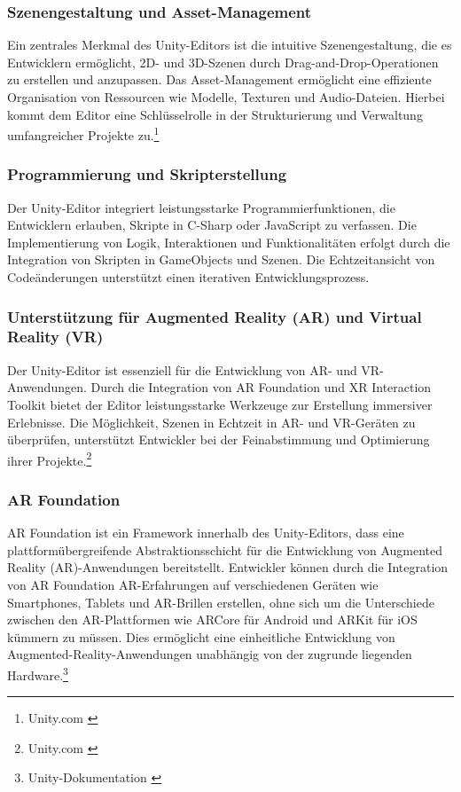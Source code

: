 \subsubsection{Szenengestaltung und Asset-Management}
Ein zentrales Merkmal des Unity-Editors ist die intuitive Szenengestaltung, die es Entwicklern ermöglicht,
2D- und 3D-Szenen durch Drag-and-Drop-Operationen zu erstellen und anzupassen. Das Asset-Management ermöglicht eine
effiziente Organisation von Ressourcen wie Modelle, Texturen und Audio-Dateien. Hierbei kommt dem Editor eine
Schlüsselrolle in der Strukturierung und Verwaltung umfangreicher Projekte zu.\footnote{Unity.com \cite{Unity Asset Manager}}

\subsubsection{Programmierung und Skripterstellung}
Der Unity-Editor integriert leistungsstarke Programmierfunktionen, die Entwicklern erlauben, Skripte in C-Sharp oder
JavaScript zu verfassen. Die Implementierung von Logik, Interaktionen und Funktionalitäten erfolgt durch die
Integration von Skripten in GameObjects und Szenen. Die Echtzeitansicht von Codeänderungen unterstützt einen
iterativen Entwicklungsprozess.

\subsubsection{Unterstützung für Augmented Reality (AR) und Virtual Reality (VR)}
Der Unity-Editor ist essenziell für die Entwicklung von AR- und VR-Anwendungen. Durch die Integration von AR Foundation
und XR Interaction Toolkit bietet der Editor leistungsstarke Werkzeuge zur Erstellung immersiver Erlebnisse. Die
Möglichkeit, Szenen in Echtzeit in AR- und VR-Geräten zu überprüfen, unterstützt Entwickler bei der Feinabstimmung
und Optimierung ihrer Projekte.\footnote{Unity.com \cite{Spiele in Augmented Reality und Virtual Reality}}

\subsubsection*{AR Foundation}
AR Foundation ist ein Framework innerhalb des Unity-Editors, dass eine plattformübergreifende Abstraktionsschicht für die
Entwicklung von Augmented Reality (AR)-Anwendungen bereitstellt. Entwickler können durch die Integration von AR Foundation
AR-Erfahrungen auf verschiedenen Geräten wie Smartphones, Tablets und AR-Brillen erstellen, ohne sich um die Unterschiede
zwischen den AR-Plattformen wie ARCore für Android und ARKit für iOS kümmern zu müssen. Dies ermöglicht eine einheitliche
Entwicklung von Augmented-Reality-Anwendungen unabhängig von der zugrunde liegenden Hardware.\footnote{Unity-Dokumentation \cite{About AR Foundation}}

